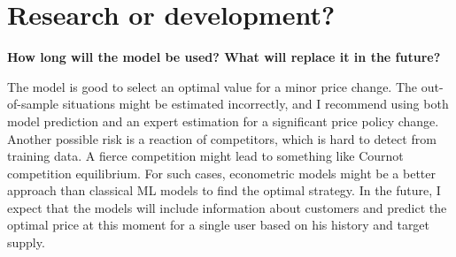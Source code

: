 \documentclass[12pt]{article}
\begin{document}
\section{Research or development?}
\textbf{How long will the model be used? What will replace it in the future?} 

The model is good to select an optimal value for a minor price change. The out-of-sample situations might be estimated incorrectly, and I recommend using both model prediction and an expert estimation for a significant price policy change. Another possible risk is a reaction of competitors, which is hard to detect from training data. A fierce competition might lead to something like Cournot competition equilibrium. For such cases, econometric models might be a better approach than classical ML models to find the optimal strategy. In the future, I expect that the models will include information about customers and predict the optimal price at this moment for a single user based on his history and target supply.

%
%
\end{document}
